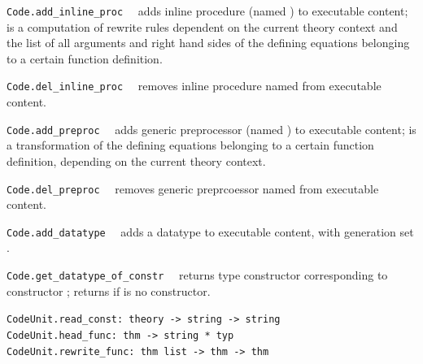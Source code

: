 \begin{isabellebody}
\begin{isamarkuptext}
\begin{description}
  \item \verb|Code.add_inline_proc|~~ adds
     inline procedure  (named ) to executable content;
      is a computation of rewrite rules dependent on
     the current theory context and the list of all arguments
     and right hand sides of the defining equations belonging
     to a certain function definition.

  \item \verb|Code.del_inline_proc|~~ removes
     inline procedure named  from executable content.

  \item \verb|Code.add_preproc|~~ adds
     generic preprocessor  (named ) to executable content;
      is a transformation of the defining equations belonging
     to a certain function definition, depending on the
     current theory context.

  \item \verb|Code.del_preproc|~~ removes
     generic preprcoessor named  from executable content.

  \item \verb|Code.add_datatype|~~ adds
     a datatype to executable content, with generation
     set .

  \item \verb|Code.get_datatype_of_constr|~~
     returns type constructor corresponding to
     constructor ; returns 
     if  is no constructor.

  \end{description}%
\end{isamarkuptext}%
\isamarkuptrue%
%
\endisatagmlref
{\isafoldmlref}%
%
\isadelimmlref
%
\endisadelimmlref
%
\isamarkuptrue%
%
\isadelimmlref
%
\endisadelimmlref
%
\isatagmlref
%
\begin{isamarkuptext}%
\begin{mldecls}
  \verb|CodeUnit.read_const: theory -> string -> string| \\
  \verb|CodeUnit.head_func: thm -> string * typ| \\
  \verb|CodeUnit.rewrite_func: thm list -> thm -> thm| \\
  \end{mldecls}


\end{isamarkuptext}
\end{isabellebody}
